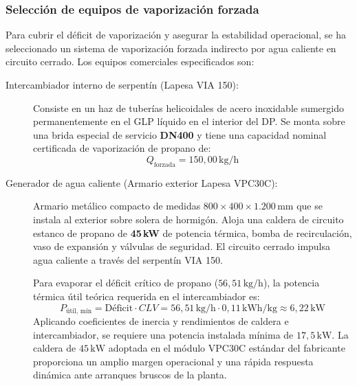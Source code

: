 \documentclass[12pt]{article}
\begin{document}
        \subsubsection{Selección de equipos de vaporización forzada}
        Para cubrir el déficit de vaporización y asegurar la estabilidad operacional, se ha seleccionado un sistema de vaporización forzada indirecto por agua caliente en circuito cerrado. Los equipos comerciales especificados son:
        \begin{description}
            \item[Intercambiador interno de serpentín (Lapesa VIA 150):]
            Consiste en un haz de tuberías helicoidales de acero inoxidable sumergido permanentemente en el GLP líquido en el interior del DP. Se monta sobre una brida especial de servicio \textbf{DN400} y tiene una capacidad nominal certificada de vaporización de propano de:
            \begin{equation}
                Q_{\text{forzada}} = 150,00\,\text{kg/h}
            \end{equation}
            \item[Generador de agua caliente (Armario exterior Lapesa VPC30C):]
            Armario metálico compacto de medidas $800 \times 400 \times 1.200\,\text{mm}$ que se instala al exterior sobre solera de hormigón. Aloja una caldera de circuito estanco de propano de \textbf{45\,kW} de potencia térmica, bomba de recirculación, vaso de expansión y válvulas de seguridad. El circuito cerrado impulsa agua caliente a través del serpentín VIA 150.
            
            Para evaporar el déficit crítico de propano ($56,51\,\text{kg/h}$), la potencia térmica útil teórica requerida en el intercambiador es:
            \begin{equation}
                P_{\text{útil, mín}} = \text{Déficit} \cdot CLV = 56,51\,\text{kg/h} \cdot 0,11\,\text{kWh/kg} \approx 6,22\,\text{kW}
            \end{equation}
            Aplicando coeficientes de inercia y rendimientos de caldera e intercambiador, se requiere una potencia instalada mínima de $17,5\,\text{kW}$. La caldera de $45\,\text{kW}$ adoptada en el módulo VPC30C estándar del fabricante proporciona un amplio margen operacional y una rápida respuesta dinámica ante arranques bruscos de la planta.
        \end{description}
\end{document}
